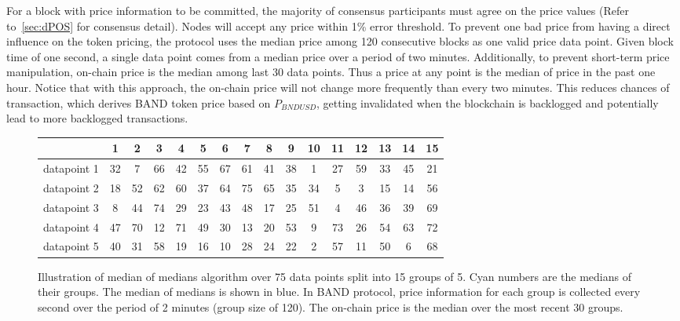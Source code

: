 \documentclass[letterpaper,11pt]{article}
\begin{document}
For a block with price information to be committed, the majority of consensus participants must agree on the price values (Refer to~\cref{sec:dPOS} for consensus detail). Nodes will accept any price within 1\% error threshold. To prevent one bad price from having a direct influence on the token pricing, the protocol uses the median price among 120 consecutive blocks as one valid price data point. Given block time of one second, a single data point comes from a median price over a period of two minutes. Additionally, to prevent short-term price manipulation, on-chain price is the median among last 30 data points. Thus a price at any point is the median of price in the past one hour. Notice that with this approach, the on-chain price will not change more frequently than every two minutes. This reduces chances of transaction, which derives BAND token price based on $P_{\mathit{BNDUSD}}$, getting invalidated when the blockchain is backlogged and potentially lead to more backlogged transactions.

\begin{figure}[!ht]
 \begin{adjustwidth}{-0.5cm}{}
\begin{tabular}{c|c|c|c|c|c|c|c|c|c|c|c|c|c|c|c}
 & 1 & 2 & 3 & 4 & 5 & 6 & 7 & 8 & 9 & 10& 11& 12& 13& 14& 15\\ \hline
datapoint 1 & {\color{cyan} 32} &7 &66 &{\color{cyan} 42} &55 &67 &61 &41 &38 &1 &{\color{cyan} 27} &59 &33 &45 &21 \\
datapoint 2& 18 &52 &{\color{cyan} 62} &60 &{\color{blue} 37} &64 &75 &65 &{\color{cyan} 35} &34 &5 &3 &15 &14 &56 \\
datapoint 3& 8 &{\color{cyan} 44} &74 &29 &23 &{\color{cyan} 43} &{\color{cyan} 48} &17 &25 &51 &4 &46 &{\color{cyan} 36} &{\color{cyan} 39} &69 \\
datapoint 4& 47 &70 &12 &71 &49 &30 &13 &20 &53 &{\color{cyan} 9} &73 &{\color{cyan} 26} &54 &63 &72 \\
datapoint 5& 40 &31 &58 &19 &16 &10 &28 &{\color{cyan} 24} &22 &2 &57 &11 &50 &6 &{\color{cyan} 68} \\
\end{tabular}
\caption{Illustration of median of medians algorithm over 75 data points split into 15 groups of 5. Cyan numbers are the medians of their groups. The median of medians is shown in blue. In BAND protocol, price information for each group is collected every second over the period of 2 minutes (group size of 120). The on-chain price is the median over the most recent 30 groups.}
\end{adjustwidth}
\end{figure}
\end{document}
